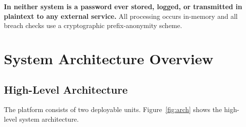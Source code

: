 \documentclass[12pt,a4paper]{article}
\begin{document}
\begin{infobox}[title={Key Security Guarantee}]
\textbf{In neither system is a password ever stored, logged, or transmitted
in plaintext to any external service.} All processing occurs in-memory
and all breach checks use a cryptographic prefix-anonymity scheme.
\end{infobox}

\section{System Architecture Overview}

\subsection{High-Level Architecture}

The platform consists of two deployable units. Figure~\ref{fig:arch} shows
the high-level system architecture.
\end{document}
